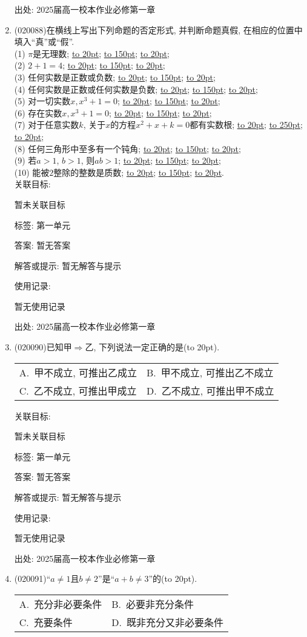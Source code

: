\documentclass[10pt,a4paper]{article}
\newcommand{\blank}[1]{\underline{\hbox to #1pt{}}}
\newcommand{\bracket}[1]{(\hbox to #1pt{})}
\newcommand{\twoch}[4]{\par\begin{tabular}{p{.46\textwidth}p{.46\textwidth}}
A.~#1& B.~#2\\
C.~#3& D.~#4
\end{tabular}}
\begin{document}
\begin{enumerate}[1.]
出处: 2025届高一校本作业必修第一章
\item { (020088)}在横线上写出下列命题的否定形式, 并判断命题真假, 在相应的位置中填入``真''或``假''.\\
(1) $\pi$是无理数; \blank{20}; \blank{150}; \blank{20};\\
(2) $2+1=4$;  \blank{20}; \blank{150}; \blank{20};\\
(3) 任何实数是正数或负数;  \blank{20}; \blank{150}; \blank{20};\\
(4) 任何实数是正数或任何实数是负数;  \blank{20}; \blank{150}; \blank{20};\\
(5) 对一切实数$x, x^3+1=0$;  \blank{20}; \blank{150}; \blank{20};\\
(6) 存在实数$x, x^3+1=0$;  \blank{20}; \blank{150}; \blank{20};\\
(7) 对于任意实数$k$, 关于$x$的方程$x^2+x+k=0$都有实数根;  \blank{20}; \blank{250}; \blank{20};\\
(8) 任何三角形中至多有一个钝角;  \blank{20}; \blank{150}; \blank{20};\\
(9) 若$a>1$, $b>1$, 则$ab>1$;  \blank{20}; \blank{150}; \blank{20};\\
(10) 能被$2$整除的整数是质数;  \blank{20}; \blank{150}; \blank{20}.\\


关联目标:

暂未关联目标



标签: 第一单元

答案: 暂无答案

解答或提示: 暂无解答与提示

使用记录:

暂无使用记录


出处: 2025届高一校本作业必修第一章
\item { (020090)}已知甲$\Rightarrow$乙, 下列说法一定正确的是\bracket{20}.
\twoch{甲不成立, 可推出乙成立}{甲不成立, 可推出乙不成立}{乙不成立, 可推出甲成立}{乙不成立, 可推出甲不成立}


关联目标:

暂未关联目标



标签: 第一单元

答案: 暂无答案

解答或提示: 暂无解答与提示

使用记录:

暂无使用记录


出处: 2025届高一校本作业必修第一章
\item { (020091)}``$a\ne 1$且$b\ne 2$''是``$a+b\ne 3$''的\bracket{20}.
\twoch{充分非必要条件}{必要非充分条件}{充要条件}{既非充分又非必要条件}



\end{enumerate}
\end{document}
